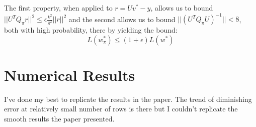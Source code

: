 \documentclass{article}
\begin{document}
        The first property, when applied to $r=Uv^\ast - y$, allows us to bound $||U^TQ_{\pi}r||^2 \leq \epsilon\frac{k^2}{8^2}||r||^2$
        and the second allows us to bound $||(U^TQ_{\pi}U)^{-1}|| < 8$, both with high probability, there by yielding the bound:
        \begin{equation}
            L(w_{\pi}^\ast) \leq (1+\epsilon)L(w^\ast)
        \end{equation}

    \newpage
    \section{Numerical Results}
        I've done my best to replicate the results in the paper.
        The trend of diminishing error at relatively small number of rows is there but I couldn't replicate the smooth results the paper presented.
\end{document}
